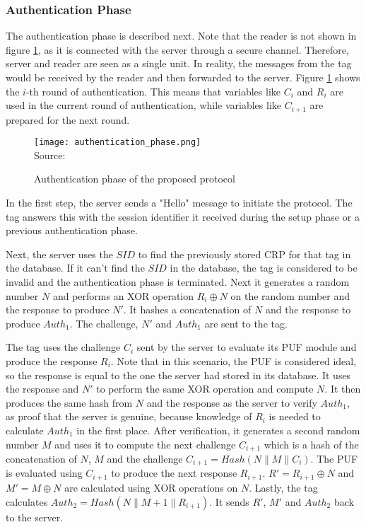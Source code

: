 \subsubsection{Authentication Phase}

The authentication phase is described next.
Note that the reader is not shown in figure \ref{fig:protocol_authentication}, as it is connected with the server through a
secure channel. Therefore, server and reader are seen as a single unit. In reality, the messages from
the tag would be received by the reader and then forwarded to the server.
Figure \ref{fig:protocol_authentication} shows the $i$-th round of authentication.
This means that variables like $C_i$ and $R_i$ are used in the current round of authentication,
while variables like $C_{i+1}$ are prepared for the next round.

\begin{figure}[H]
    \centering
    \caption{Authentication phase of the proposed protocol}
    \label{fig:protocol_authentication}
    \texttt{[image: authentication\_phase.png]}
    \\
    Source: \cite[][p. 7]{Zhu2019}
\end{figure}

In the first step, the server sends a "Hello" message to initiate the protocol. The tag answers this
with the session identifier it received during the setup phase or a previous authentication phase. \cite[][p. 7]{Zhu2019}

Next, the server uses the $SID$ to find the previously stored \ac{CRP} for that tag in the database.
If it can't find the $SID$ in the database, the tag is considered to be invalid and the authentication phase is
terminated.
Next it generates a random number $N$ and performs an XOR operation $R_i \oplus N$ on the random number and the response
to produce $N'$. It hashes a concatenation of $N$ and the response to produce $Auth_1$.
The challenge, $N'$ and $Auth_1$ are sent to the tag. \cite[][p. 7]{Zhu2019}

The tag uses the challenge $C_i$ sent by the server to evaluate its PUF module and produce
the response $R_i$. Note that in this scenario, the PUF is considered ideal, so the response is equal to the one the
server had stored in its database.
It uses the response and $N'$ to perform the same XOR operation and compute $N$.
It then produces the same hash from $N$ and the response as the server to verify $Auth_1$, as proof that
the server is genuine, because knowledge of $R_i$ is needed to calculate $Auth_1$ in the first place.
After verification, it generates a second random number $M$ and uses it to compute the next challenge $C_{i+1}$
which is a hash of the concatenation of $N$, $M$ and the challenge $C_{i+1}=Hash(N\parallel M \parallel C_i)$.
The PUF is evaluated using $C_{i+1}$ to produce the next response $R_{i+1}$.
$R'=R_{i+1} \oplus N$ and $M' = M \oplus N$ are calculated using XOR operations on $N$.
Lastly, the tag calculates $Auth_2 = Hash(N \parallel M+1 \parallel R_{i+1})$.
It sends $R'$, $M'$ and $Auth_2$ back to the server. \cite[][p. 7]{Zhu2019}

